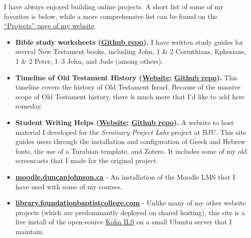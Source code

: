 
I have always enjoyed building online projects. A short list of some of my favorites is below, while a more comprehensive list can be found on the \href{http://duncanjohnson.ca/projects/}{``Projects'' page of my website}.

\begin{itemize}
\item \textbf{Bible study worksheets (\href{https://github.com/dtjohnso/bible-study-worksheets}{Github repo}).} I have written study guides for several New Testament books, including John, 1 \& 2 Corinthians, Ephesians, 1 \& 2 Peter, 1--3 John, and Jude (among others).
\item \textbf{Timeline of Old Testament History (\href{http://duncanjohnson.ca/OT-Timeline/}{Website}; \href{https://github.com/dtjohnso/OT-Timeline}{Github repo}).} This timeline covers the history of Old Testament Israel. Because of the massive scope of Old Testament history, there is much more that I'd like to add here someday.
\item \textbf{Student Writing Helps (\href{http://duncanjohnson.ca/Student-Writing-Helps/}{Website}; \href{https://github.com/dtjohnso/Student-Writing-Helps}{Github repo}).} A website to host material I developed for the \textit{Seminary Project Labs} project at BJU. This site guides users through the installation and configuration of Greek and Hebrew fonts, the use of a Turabian template, and Zotero. It includes some of my old screencasts that I made for the original project.
\item \textbf{\href{http://moodle.duncanjohnson.ca/}{moodle.duncanjohnson.ca}} - An installation of the Moodle LMS that I have used with some of my courses.
\item \textbf{\href{http://library.foundationbaptistcollege.com/}{library.foundationbaptistcollege.com}} - Unlike many of my other website projects (which are predominantly deployed on shared hosting), this site is a live install of the open-source \href{https://koha-community.org/}{Koha ILS} on a small Ubuntu server that I maintain.
\end{itemize}